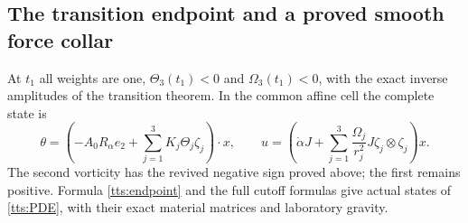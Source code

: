\subsection{The transition endpoint and a proved smooth force collar}

At $t_1$ all weights are one, $\Theta_3(t_1)<0$ and
$\Omega_3(t_1)<0$, with the exact inverse amplitudes of the
transition theorem. In the common affine cell the complete state is
\begin{equation}\label{tts:endpoint}
 \theta=\left(-A_0R_\alpha e_2+
             \sum_{j=1}^3K_j\Theta_j\zeta_j\right)\cdot x,
 \qquad
 u=\left(\dot\alpha J+
    \sum_{j=1}^3\frac{\Omega_j}{r_j^2}
                          J\zeta_j\otimes\zeta_j\right)x.
\end{equation}
The second vorticity has the revived negative sign proved above;
the first remains positive. Formula \eqref{tts:endpoint} and the
full cutoff formulas give actual states of \eqref{tts:PDE}, with
their exact material matrices and laboratory gravity.

